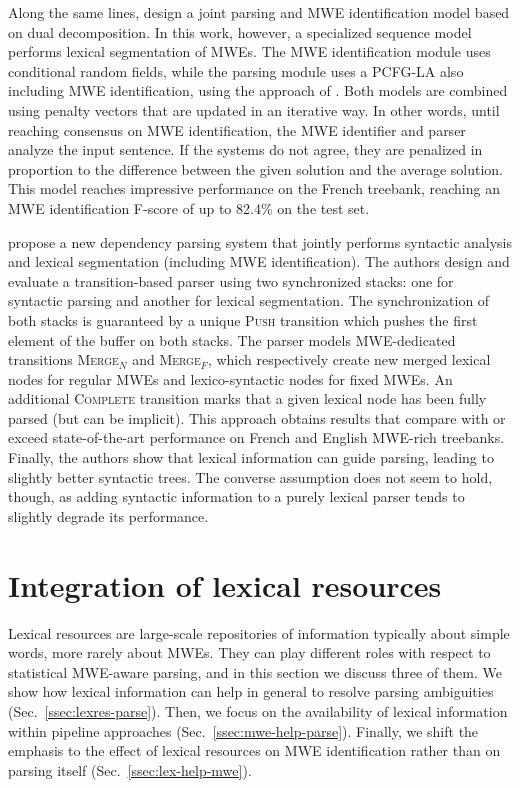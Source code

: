 \documentclass[output=paper]{LSP/langsci}
\begin{document}
Along the same lines, \citet{leroux14} design a joint parsing and MWE identification model based on dual decomposition.
In this work, however, a specialized sequence model performs lexical segmentation of MWEs.
The MWE identification module uses conditional random fields, while the parsing module uses a PCFG-LA also including MWE identification, using the approach of \citet{green13}. 
Both models are combined using penalty vectors that are updated in an iterative way.
In other words, until reaching consensus on MWE identification, the MWE identifier and parser analyze the input sentence.
If the systems do not agree, they are penalized in proportion to the difference between the given solution and the average solution.
This model reaches impressive performance on the French treebank, reaching an MWE identification F-score of up to 82.4\% on the test set.


\citet{constantnivre16} propose a new dependency parsing system that jointly performs syntactic analysis and lexical segmentation (including MWE identification).
The authors design and evaluate a transition-based parser using two synchronized stacks: one for syntactic parsing and another for lexical segmentation.
The synchronization of both stacks is guaranteed by a unique {\scshape Push} transition which pushes the first element of the buffer on both stacks.
The parser models MWE-dedicated transitions {\scshape Merge$_N$} and {\scshape Merge$_F$}, which respectively create new merged lexical nodes for regular MWEs and lexico-syntactic nodes for fixed MWEs.
An additional {\scshape Complete} transition marks that a given lexical node has been fully parsed (but can be implicit). This approach obtains results that compare with or exceed state-of-the-art performance on French and English MWE-rich treebanks.
Finally, the authors show that lexical information can guide parsing, leading to slightly better syntactic trees.
The converse assumption does not seem to hold, though, as adding syntactic information to a purely lexical parser tends to slightly degrade its performance.



%
\section{Integration of lexical resources}
\label{sec:resources}

Lexical resources are large-scale repositories of information typically about simple words, more rarely about MWEs. 
They can play different roles with respect to statistical MWE-aware parsing, and in this section we discuss three of them. We show how lexical information can help in general to resolve parsing ambiguities (Sec.~\ref{ssec:lexres-parse}). Then, we focus on the availability of lexical information within pipeline approaches (Sec.~\ref{ssec:mwe-help-parse}). Finally, we shift the emphasis to the effect of lexical resources on MWE identification rather than on parsing itself (Sec.~\ref{ssec:lex-help-mwe}).
\end{document}
